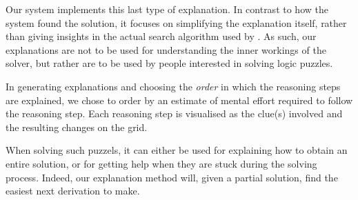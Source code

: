 Our system implements this last type of explanation. In contrast to how the system found the solution, it focuses on simplifying the explanation itself, rather than giving insights in the actual search algorithm used by \idp. As such, our explanations are not to be used for understanding the inner workings of the solver, but rather are to be used by people interested in solving logic puzzles.

In generating explanations and choosing the \textit{order} in which the reasoning steps are explained, we chose to order by an estimate of mental effort required to follow the reasoning step. Each reasoning step is visualised as the clue(s) involved and the resulting changes on the grid.

When solving such puzzels, it can either be used for explaining how to obtain an entire solution, or for getting help when they are stuck during the solving process. Indeed, our explanation method will, given a partial solution, find the easiest next derivation to make. 

